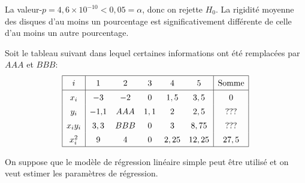 \begin{questions}
\begin{parts}
\begin{solution}
La valeur-$p = 4{,}6\times10^{-10} < 0{,}05 = \alpha$, donc on rejette $H_0$. La rigidité moyenne des disques d'au moins un pourcentage est significativement différente de celle d'au moins un autre pourcentage.
\end{solution}

\end{parts}
\pageblanche

\question\label{rls} Soit le tableau suivant dans lequel certaines informations ont été remplacées par $AAA$ et $BBB$:
\begin{align*}\renewcommand{\arraystretch}{1.4}
   \begin{array}{|c|ccccc|c|}
   \hline
   i & 1 & 2 & 3& 4& 5& \text{Somme}\\ \hline
x_i & -3 & -2 & 0 & 1,5 & 3,5  &0 \\  
y_i & -1{,}1 & AAA & 1,1 & 2 & 2,5 & ???\\ 
x_iy_i & 3,3 & BBB & 0 & 3 & 8,75 & ??? \\ 
x_i^2 & 9 & 4 & 0 & 2,25 & 12,25 & 27,5\\ \hline
\end{array} 
\end{align*}

On suppose que le modèle de régression linéaire simple peut être utilisé et on veut estimer les paramètres de régression.

\end{questions}
